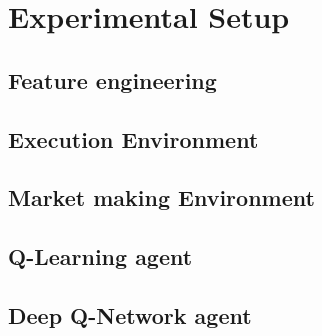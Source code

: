 \chapter{Experimental Setup}
\label{chap:setup}

\section{Feature engineering}

\section{Execution Environment}

\section{Market making Environment}

\section{Q-Learning agent}

\section{Deep Q-Network agent}
